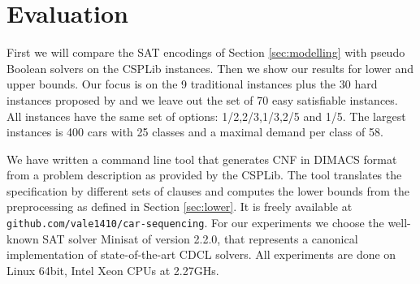 \documentclass[]{llncs}
\begin{document}

\section{Evaluation}
\label{sec:experiments}
                                                                      
First we will compare the SAT encodings of Section \ref{sec:modelling} with pseudo Boolean solvers on the CSPLib
instances. Then we show our results for lower and upper bounds. Our focus is on the 9 traditional instances plus the 30
hard instances proposed by \cite{Gravel05} and we leave out the set of 70 easy satisfiable instances. All instances have
the same set of options: 1/2,2/3,1/3,2/5 and 1/5. The largest instances is 400 cars with 25 classes and a maximal demand
per class of 58. 

We have written a command line tool that generates CNF in DIMACS format from a problem description as provided by the
CSPLib. The tool translates the specification by different sets of clauses and computes the lower bounds from the
preprocessing as defined in Section \ref{sec:lower}. It is freely available at \\
\verb+github.com/vale1410/car-sequencing+. For our experiments we choose the well-known SAT solver Minisat \cite{Een03}
of version 2.2.0, that represents a canonical implementation of state-of-the-art CDCL solvers. All experiments are done
on Linux 64bit, Intel Xeon CPUs at 2.27GHs. 
\end{document}
